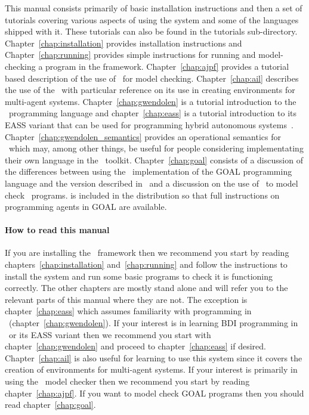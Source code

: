 This manual consists primarily of basic installation instructions and then a set of tutorials covering various aspects of using the system and some of the languages shipped with it.  These tutorials can also be found in the tutorials sub-directory.  Chapter~\ref{chap:installation} provides installation instructions and Chapter~\ref{chap:running} provides simple instructions for running and model-checking a program in the framework.  Chapter~\ref{chap:ajpf} provides a tutorial based description of the use of \ajpf\ for model checking.  Chapter~\ref{chap:ail} describes the use of the \ail\ with particular reference on its use in creating environments for multi-agent systems.  Chapter~\ref{chap:gwendolen} is a tutorial introduction to the \gwendolen\ programming language and chapter~\ref{chap:eass} is a tutorial introduction to its EASS variant that can be used for programming hybrid autonomous systems~.  Chapter~\ref{chap:gwendolen_semantics} provides an operational semantics for \gwendolen\ which may, among other things, be useful for people considering implementating their own language in the \ail\ toolkit.  Chapter~\ref{chap:goal} consists of a discussion of the differences between using the \ail\ implementation of the GOAL programming language and the version described in~\cite{goalmanual} and a discussion on the use of \ajpf\ to model check \goal\ programs.  \cite{goalmanual} is included in the distribution so that full instructions on programming agents in GOAL are available.

\paragraph{How to read this manual}  If you are installing the \mcapl\ framework then we recommend you start by reading chapters~\ref{chap:installation} and~\ref{chap:running} and follow the instructions to install the system and run some basic programs to check it is functioning correctly.  The other chapters are mostly stand alone and will refer you to the relevant parts of this manual where they are not.  The exception is chapter~\ref{chap:eass} which assumes familiarity with programming in \gwendolen\ (chapter~\ref{chap:gwendolen}).  If your interest is in learning BDI programming in \gwendolen\ or its EASS variant then we recommend you start with chapter~\ref{chap:gwendolen} and proceed to chapter~\ref{chap:eass} if desired.  Chapter~\ref{chap:ail} is also useful for learning to use this system since it covers the creation of environments for multi-agent systems.  If your interest is primarily in using the \ajpf\ model checker then we recommend you start by reading chapter~\ref{chap:ajpf}.  If you want to model check GOAL programs then you should read chapter~\ref{chap:goal}.

